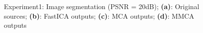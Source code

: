 \begin{figure}[h]
{\begin{minipage}[b]{0.23\linewidth}
\end{minipage}} 
\caption{Experiment1: Image segmentation (PSNR = 20dB); \textbf{(a)}: Original sources; \textbf{(b)}: FastICA outputs; \textbf{(c)}: MCA outputs; \textbf{(d)}: MMCA outputs}
\label{segmentation_Im}
\end{figure}


